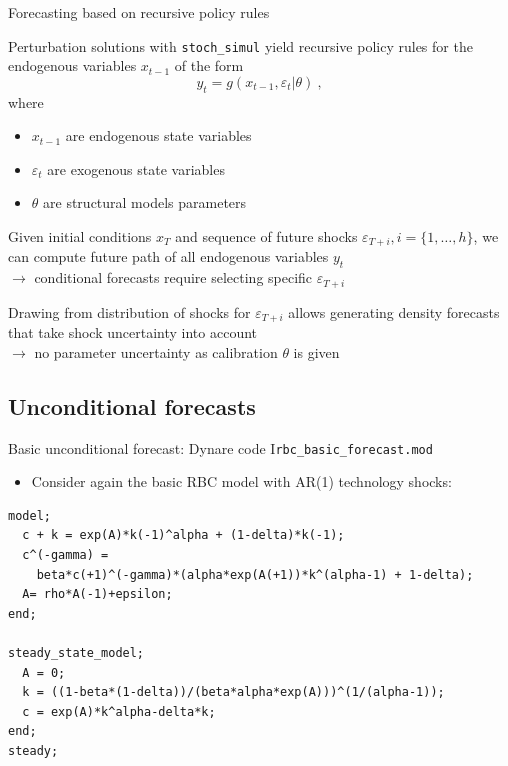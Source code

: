 \documentclass[handout,usepdftitle=false,xcolor=dvipsnames,aspectratio=169]{beamer}
\begin{document}
\begin{frame}{Forecasting based on recursive policy rules}
  \begin{witemize}
    \item Perturbation solutions with \texttt{stoch\_simul} yield recursive policy rules for the endogenous variables $x_{t-1}$ of the form
    \begin{equation}
      y_t = g(x_{t-1},\varepsilon_t|\theta) \: ,
    \end{equation}
    where
    \begin{itemize}
      \item $x_{t-1}$ are endogenous state variables
      \item $\varepsilon_t$ are exogenous state variables
      \item $\theta$ are structural models parameters
    \end{itemize}
    \item Given initial conditions $x_{T}$ and sequence of future shocks $\varepsilon_{T+i},i=\{1,\ldots,h\}$, we can compute future path of all endogenous variables $y_t$\\
    $\rightarrow$ conditional forecasts require selecting specific $\varepsilon_{T+i}$ 
    \item Drawing from distribution of shocks for $\varepsilon_{T+i}$ allows generating density forecasts that take shock uncertainty into account\\
    $\rightarrow$ no parameter uncertainty as calibration $\theta$ is given
  \end{witemize}
\end{frame}

\subsection{Unconditional forecasts}

\begin{frame}[fragile]{Basic unconditional forecast: Dynare code I}{\texttt{rbc\_basic\_forecast.mod}}
  \begin{itemize}
    \item Consider again the basic RBC model with AR(1) technology shocks:
  \end{itemize}
  \begin{verbatim}
model;
  c + k = exp(A)*k(-1)^alpha + (1-delta)*k(-1);
  c^(-gamma) = 
    beta*c(+1)^(-gamma)*(alpha*exp(A(+1))*k^(alpha-1) + 1-delta);
  A= rho*A(-1)+epsilon;
end;

steady_state_model;
  A = 0;
  k = ((1-beta*(1-delta))/(beta*alpha*exp(A)))^(1/(alpha-1));
  c = exp(A)*k^alpha-delta*k;
end;
steady;
\end{verbatim}
\end{frame}
\end{document}
